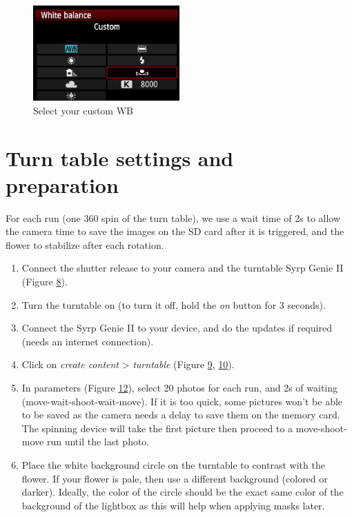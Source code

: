 \documentclass[
]{book}
\begin{document}
\begin{figure}
\hypertarget{WB_sub2}{%
\centering
\includegraphics[width=0.5\textwidth,height=\textheight]{Figures/Custom WB selection.png}
\caption{Select your custom WB}\label{WB_sub2}
}
\end{figure}

\hypertarget{turn-table-settings-and-preparation}{%
\section{Turn table settings and preparation}\label{turn-table-settings-and-preparation}}

For each run (one 360 spin of the turn table), we use a wait time of 2s
to allow the camera time to save the images on the SD card after it is
triggered, and the flower to stabilize after each rotation.

\begin{enumerate}
\def\labelenumi{\arabic{enumi}.}
\item
  Connect the shutter release to your camera and the turntable Syrp
  Genie II (Figure \protect\hyperlink{fig:shutter}{8}).
\item
  Turn the turntable on (to turn it off, hold the \emph{on} button for 3
  seconds).
\item
  Connect the Syrp Genie II to your device, and do the updates if
  required (needs an internet connection).
\item
  Click on \emph{create content} \textgreater{} \emph{turntable} (Figure
  \protect\hyperlink{genie_root}{9},
  \protect\hyperlink{genie_content}{10}).
\item
  In parameters (Figure \protect\hyperlink{record}{12}), select 20 photos for each run, and 2s of
  waiting (move-wait-shoot-wait-move). If it is too quick, some
  pictures won't be able to be saved as the camera needs a delay to
  save them on the memory card. The spinning device will take the
  first picture then proceed to a move-shoot-move run until the last
  photo.
\item
  Place the white background circle on the turntable to contrast with
  the flower. If your flower is pale, then use a different background
  (colored or darker). Ideally, the color of the circle should be the
  exact same color of the background of the lightbox as this will help
  when applying masks later.
\end{enumerate}
\end{document}

